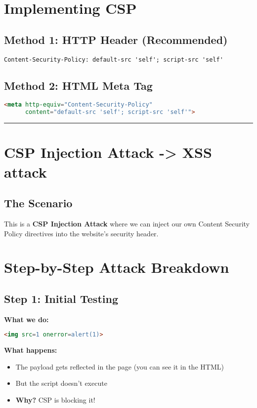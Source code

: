 \documentclass{article}
\begin{document}
\begin{itemize}
\section{Implementing CSP}

\subsection{Method 1: HTTP Header (Recommended)}
\begin{lstlisting}[backgroundcolor=\color{gray!10}]
Content-Security-Policy: default-src 'self'; script-src 'self'
\end{lstlisting}

\subsection{Method 2: HTML Meta Tag}
\begin{lstlisting}[language=HTML, backgroundcolor=\color{gray!10}]
<meta http-equiv="Content-Security-Policy" 
      content="default-src 'self'; script-src 'self'">
\end{lstlisting}
\rule{15cm}{0.4pt}




\section{CSP Injection Attack -> XSS attack}

\subsection{The Scenario}
This is a \textbf{CSP Injection Attack} where we can inject our own Content Security Policy directives into the website's security header.

\section{Step-by-Step Attack Breakdown}

\subsection{Step 1: Initial Testing}
\textbf{What we do:}
\begin{lstlisting}[language=HTML, frame=single]
<img src=1 onerror=alert(1)>
\end{lstlisting}

\textbf{What happens:}
\begin{itemize}
    \item The payload gets reflected in the page (you can see it in the HTML)
    \item But the script doesn't execute
    \item \textbf{Why?} CSP is blocking it!
\end{itemize}


\end{itemize}
\end{document}
